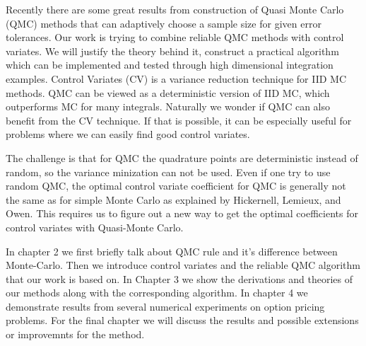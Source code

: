 

Recently there are some great results from construction of Quasi Monte Carlo (QMC) methods that can adaptively choose a sample size for given error tolerances\cite{hickernell2014reliable}.   
Our work is trying to combine reliable QMC methods with control variates. We will justify the theory behind it, construct a practical algorithm which can be implemented and tested through high dimensional integration examples.
Control Variates (CV) is a variance reduction technique for IID MC methods.
QMC can be viewed as a deterministic version of IID MC, which outperforms MC for many integrals\cite{avramidis1996integrated}. 
Naturally we wonder if QMC can also benefit from the CV technique. If that is possible, it can be especially useful for problems where we can easily find good control variates.


The challenge is that for QMC the quadrature points are deterministic instead of random, so the variance minization can not be used. 
Even if one try to use random QMC, the optimal control variate coefficient for QMC is generally not the same as for simple Monte Carlo as explained by Hickernell, Lemieux, and Owen\cite{hickernell2005control}. 
This requires us to figure out a new way to get the optimal coefficients for control variates with Quasi-Monte Carlo.


In chapter 2 we first briefly talk about QMC rule and it's difference between Monte-Carlo. 
Then we introduce control variates and the reliable QMC algorithm that our work is based on. 
In Chapter 3 we show the derivations and theories of our methods along with the corresponding algorithm.
In chapter 4 we demonstrate results from several numerical experiments on option pricing problems. For the final chapter we will discuss the results and possible extensions or improvemnts for the method.
